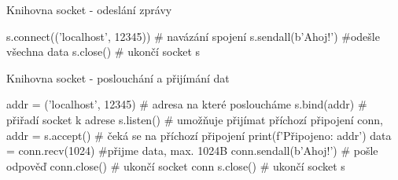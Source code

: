 \documentclass{beamer}
\begin{document}
\begin{frame}{Knihovna socket - odeslání zprávy}
    \begin{semiverbatim}
	s.connect(('localhost', 12345)) # navázání spojení
	s.sendall(b'Ahoj!') #odešle všechna data
	s.close() # ukončí socket s
    \end{semiverbatim}
\end{frame}

\begin{frame}{Knihovna socket - poslouchání  a přijímání dat}
    \begin{semiverbatim}
	addr = ('localhost', 12345) # adresa na které posloucháme
	s.bind(addr) # přiřadí socket k adrese
	s.listen() # umožňuje přijímat příchozí připojení
	conn, addr = s.accept() # čeká se na příchozí připojení
	print(f'Připojeno: {addr}')
	data = conn.recv(1024) #přijme data, max. 1024B
	conn.sendall(b'Ahoj!') # pošle odpověď
	conn.close() # ukončí socket conn
	s.close() # ukončí socket s
    \end{semiverbatim}
\end{frame}
\end{document}
